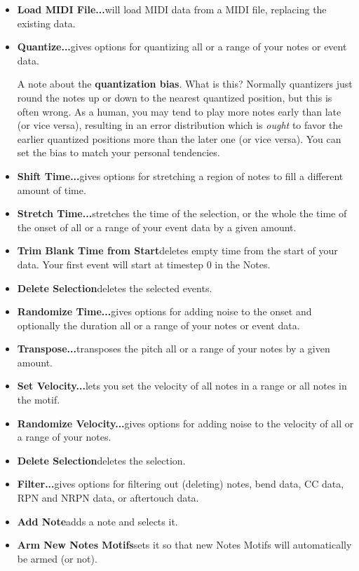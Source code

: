 \documentclass[twoside,10pt]{article}
\begin{document}
\begin{itemize}

\item{\bf Load MIDI File...}\quad will load MIDI data from a MIDI file, replacing the existing data.

\item{\bf Quantize...}\quad gives options for quantizing all or a range of your notes or event data. 

 A note about  the {\bf quantization bias}.  What is this?  Normally quantizers just round the notes up or down to the nearest quantized position, but this is often wrong.  As a human, you may tend to play more notes early than late (or vice versa), resulting in an error distribution which is {\it ought} to favor the earlier quantized positions more than the later one (or vice versa).  You can set the bias to match your personal tendencies.

\item{\bf Shift Time...}\quad gives options for stretching a region of notes to fill a different amount of time.

\item{\bf Stretch Time...}\quad stretches the time of the selection, or the whole  the time of the onset of all or a range of your event data by a given amount.

\item{\bf Trim Blank Time from Start}\quad deletes empty time from the start of your data.  Your first event will start at timestep 0 in the Notes.
\item{\bf Delete Selection}\quad deletes the selected events.

\item{\bf Randomize Time...}\quad gives options for adding noise to the onset and optionally the duration all or a range of your notes or event data.

\item{\bf Transpose...}\quad transposes the pitch all or a range of your notes by a given amount.

\item{\bf Set Velocity...}\quad lets you set the velocity of all notes in a range or all notes in the motif.

\item{\bf Randomize Velocity...}\quad gives options for adding noise to the velocity of all or a range of your notes.

\item{\bf Delete Selection}\quad deletes the selection.

\item{\bf Filter...}\quad gives options for filtering out (deleting) notes, bend data, CC data, RPN and NRPN data, or aftertouch data.

\item{\bf Add Note}\quad adds a note and selects it.

\item{\bf Arm New Notes Motifs}\quad sets it so that new Notes Motifs will automatically be armed (or not).

\end{itemize}
\end{document}
